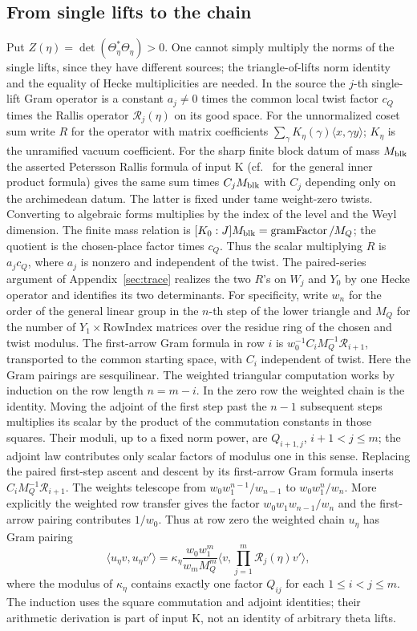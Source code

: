 \subsection{From single lifts to the chain}\label{c3:chain}

Put $Z(\eta)=\det(\Theta_\eta^*\Theta_\eta)>0$.
One cannot simply multiply the norms of the single lifts, since
they have different sources; the triangle-of-lifts norm identity
and the equality of Hecke multiplicities are needed. In the source
the $j$-th single-lift Gram operator is a constant $a_j\ne0$
times the common local twist factor $c_Q$ times the Rallis operator
$\mathcal R_j(\eta)$ on its good space. For the unnormalized coset sum write $R$ for the operator with
matrix coefficients $\sum_\gamma K_\eta(\gamma)
\langle x,\gamma y\rangle$; $K_\eta$ is the unramified vacuum
coefficient. For the sharp finite block datum of mass $M_{\rm blk}$
the asserted Petersson Rallis formula of input K (cf.~\cite{gqt} for the general inner product formula) gives the
same sum times $C_jM_{\rm blk}$ with $C_j$ depending only on
the archimedean datum. The latter is fixed under tame weight-zero
twists. Converting to algebraic forms multiplies by the index
of the level and the Weyl dimension. The finite mass relation is
$[K_0:J]M_{\rm blk}=\operatorname{gramFactor}/M_Q$;
the quotient is the chosen-place factor times $c_Q$.
Thus the scalar multiplying $R$ is $a_j c_Q$, where $a_j$
is nonzero and independent of the twist. The paired-series
argument of Appendix~\ref{sec:trace} realizes the two $R$'s
on $W_j$ and $Y_0$ by one Hecke operator and identifies its
two determinants.
For specificity, write $w_n$ for the order of the general linear
group in the $n$-th step of the lower triangle and $M_Q$ for the
number of $Y_1\times\mathrm{RowIndex}$ matrices over the residue
ring of the chosen and twist modulus. The first-arrow Gram formula
in row $i$ is $w_0^{-1}C_i M_Q^{-1}\mathcal R_{i+1}$, transported
to the common starting space, with $C_i$ independent of twist.
Here the Gram pairings are sesquilinear.
The weighted triangular computation works by induction on the row
length $n=m-i$. In the zero row the weighted chain is the identity.
Moving the adjoint of the first step past the $n-1$ subsequent
steps multiplies its scalar by the product of the commutation
constants in those squares. Their moduli, up to a fixed norm
power, are $Q_{i+1,j}$, $i+1<j\le m$; the adjoint law contributes
only scalar factors of modulus one in this sense. Replacing the
paired first-step ascent and descent by its first-arrow Gram
formula inserts $C_i M_Q^{-1}\mathcal R_{i+1}$.
The weights telescope from $w_0w_1^{n-1}/w_{n-1}$
to $w_0w_1^n/w_n$. More explicitly the weighted row transfer
gives the factor $w_0 w_1 w_{n-1}/w_n$ and the first-arrow
pairing contributes $1/w_0$.
Thus at row zero the weighted chain $u_\eta$ has Gram pairing
\[
 \langle u_\eta v,u_\eta v'\rangle
 =\kappa_\eta\frac{w_0w_1^m}{w_m M_Q^m}
    \langle v,\prod_{j=1}^m\mathcal R_j(\eta)v'\rangle,
\]
where the modulus of $\kappa_\eta$ contains exactly one factor
$Q_{ij}$ for each $1\le i<j\le m$. The induction uses the square
commutation and adjoint identities; their arithmetic derivation
is part of input K, not an identity of arbitrary theta lifts.

